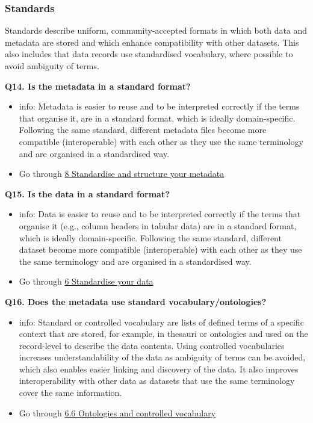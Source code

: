 \documentclass[
  oneside]{book}
\providecommand{\tightlist}{%
  \setlength{\itemsep}{0pt}\setlength{\parskip}{0pt}}
\begin{document}
\subsubsection*{Standards}\label{standards}

Standards describe uniform, community-accepted formats in which both data and metadata are stored and which enhance compatibility with other datasets. This also includes that data records use standardised vocabulary, where possible to avoid ambiguity of terms.

\textbf{Q14. Is the metadata in a standard format?}

\begin{itemize}
\tightlist
\item
  info: Metadata is easier to reuse and to be interpreted correctly if the terms that organise it, are in a standard format, which is ideally domain-specific. Following the same standard, different metadata files become more compatible (interoperable) with each other as they use the same terminology and are organised in a standardised way.
\item
  Go through \hyperref[standardise-and-structure-your-metadata]{8 Standardise and structure your metadata}
\end{itemize}

\textbf{Q15. Is the data in a standard format?}

\begin{itemize}
\tightlist
\item
  info: Data is easier to reuse and to be interpreted correctly if the terms that organise it (e.g., column headers in tabular data) are in a standard format, which is ideally domain-specific. Following the same standard, different dataset become more compatible (interoperable) with each other as they use the same terminology and are organised in a standardised way.
\item
  Go through \hyperref[standardise-your-data]{6 Standardise your data}
\end{itemize}

\textbf{Q16. Does the metadata use standard vocabulary/ontologies?}

\begin{itemize}
\tightlist
\item
  info: Standard or controlled vocabulary are lists of defined terms of a specific context that are stored, for example, in thesauri or ontologies and used on the record-level to describe the data contents. Using controlled vocabularies increases understandability of the data as ambiguity of terms can be avoided, which also enables easier linking and discovery of the data. It also improves interoperability with other data as datasets that use the same terminology cover the same information.
\item
  Go through \hyperref[ontologies]{6.6 Ontologies and controlled vocabulary}
\end{itemize}
\end{document}
